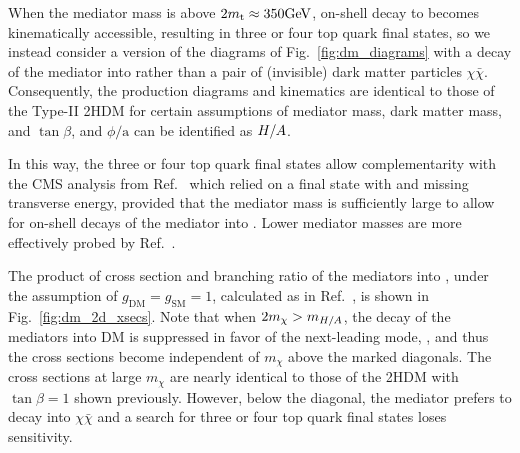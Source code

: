 When the mediator mass is above $2 m_\mathrm{t} \approx 350\text{GeV}$, on-shell
decay to \ttbar becomes kinematically accessible, resulting in three or four top
quark final states, so we instead consider a version of the diagrams of
Fig.~\ref{fig:dm_diagrams} with a decay of the mediator into \ttbar rather
than a pair of (invisible) dark matter particles $\chi\bar{\chi}$.
Consequently, the production diagrams and kinematics are identical to those
of the Type-II 2HDM for certain assumptions of mediator mass, dark matter mass,
and $\tan\beta$, and $\phi/\mathrm{a}$ can be identified as $H/A$.

In this way, the three or four top quark final states
allow complementarity with the CMS analysis from Ref.~\cite{CMS:DMsingletop} which relied on
a final state with \ttbar and missing transverse energy, provided that
the mediator mass is sufficiently large to allow for on-shell decays of the mediator into \ttbar.
Lower mediator masses are more effectively probed by Ref.~\cite{CMS:DMsingletop}.

The product of cross section and branching ratio of the mediators into \ttbar,
under the assumption of $g_\mathrm{DM}=g_\mathrm{SM}=1$,
calculated as in Ref.~\cite{CMS:DMsingletop}, is shown in 
Fig.~\ref{fig:dm_2d_xsecs}. Note that when $2 m_{\chi}>m_{H/A}$,
the decay of the mediators into DM is suppressed in favor of the next-leading mode,
\ttbar, and thus the cross sections become independent of $m_\chi$ above the
marked diagonals. The cross sections at large $m_\chi$ are nearly
identical to those of the 2HDM with $\tan\beta = 1$ shown previously.
However, below the diagonal, the mediator prefers to decay into $\chi\bar{\chi}$
and a search for three or four top quark final states loses sensitivity.

